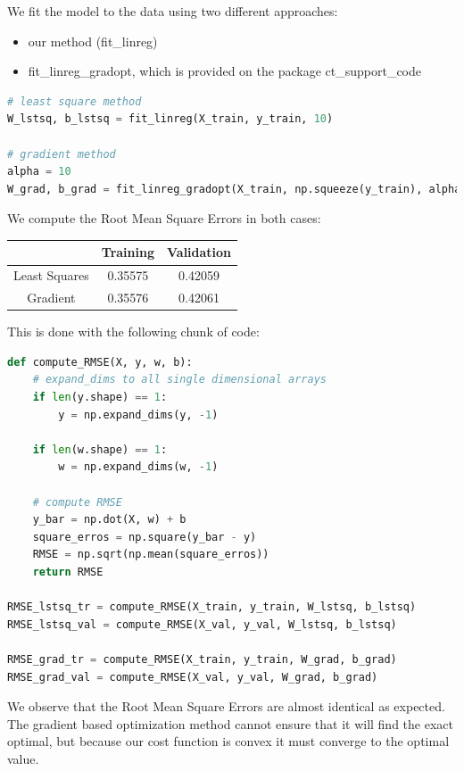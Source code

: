 \documentclass{article}
\begin{document}
We fit the model to the data using two different approaches:
\begin{itemize}
    \item our method (fit\_linreg) 
    \item fit\_linreg\_gradopt, which is provided on the package ct\_support\_code
\end{itemize}

\begin{lstlisting}[language= Python]
# least square method
W_lstsq, b_lstsq = fit_linreg(X_train, y_train, 10)

# gradient method
alpha = 10
W_grad, b_grad = fit_linreg_gradopt(X_train, np.squeeze(y_train), alpha)
\end{lstlisting}

We compute the Root Mean Square Errors in both cases:

\begin{center}
\begin{tabular}{ | c | c | c | } 
\hline
 & Training & Validation \\
\hline
Least Squares & 0.35575 & 0.42059 \\ 
\hline
Gradient & 0.35576 & 0.42061 \\ 
\hline
\end{tabular}
\end{center}

This is done with the following chunk of code:

\begin{lstlisting}[language= Python]
def compute_RMSE(X, y, w, b):
    # expand_dims to all single dimensional arrays
    if len(y.shape) == 1:
        y = np.expand_dims(y, -1)

    if len(w.shape) == 1:
        w = np.expand_dims(w, -1)
    
    # compute RMSE
    y_bar = np.dot(X, w) + b
    square_erros = np.square(y_bar - y)
    RMSE = np.sqrt(np.mean(square_erros))
    return RMSE 

RMSE_lstsq_tr = compute_RMSE(X_train, y_train, W_lstsq, b_lstsq)
RMSE_lstsq_val = compute_RMSE(X_val, y_val, W_lstsq, b_lstsq)

RMSE_grad_tr = compute_RMSE(X_train, y_train, W_grad, b_grad)
RMSE_grad_val = compute_RMSE(X_val, y_val, W_grad, b_grad)
\end{lstlisting}

We observe that the Root Mean Square Errors are almost identical as expected. The gradient based optimization method cannot ensure that it will find the exact optimal, but because our cost function is convex it must converge to the optimal value.
\end{document}
